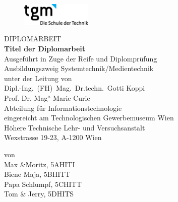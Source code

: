 

\def\tpdefault{{\sf \center \vspace*{-4cm}


\begin{figure}[h]
\begin{flushright}	
		\includegraphics[width=0.3\textwidth]{graphics/title/tgmlogo2.png}
	\label{fig:tgmlogo}
\end{flushright}
\end{figure}


\vspace{2cm}


{\Large %
DIPLOMARBEIT\\ \vspace{0.7cm}}
 {\LARGE \sloppy
{\bf \sf  \textbf{Titel der Diplomarbeit}
\\}}
%
%
\vspace*{2cm}
{\normalsize Ausgef\"uhrt in Zuge der Reife und Diplompr\"ufung\\
Ausbildungszweig Systemtechnik/Medientechnik\\ %
  \vspace{1.5cm}
  \normalsize unter der Leitung von\\
  \large Dipl.-Ing.~(FH)\ Mag.\ Dr.techn.\ Gotti Koppi\\
  \large Prof. Dr. Mag$^a$ Marie Curie\\ 
  \normalsize Abteilung für
  Informationstechnologie\\
  \vspace{1.5cm}
  eingereicht am  Technologischen Gewerbemuseum Wien\\
  H\"ohere Technische Lehr- und Versuchsanstalt\\
  Wexstrasse 19-23, A-1200 Wien\\
  }}}


\begin{titlepage}
	\tpdefault
	{\sf \center \vspace{1.0cm}
	\normalsize von\\
	\large 
	Max \&Moritz, 5AHITI\\
	Biene Maja, 5BHITT\\
	Papa Schlumpf, 5CHITT\\
	Tom \& Jerry, 5DHITS\\
	\vspace {2 cm}
	\bf {} \\
	
	}



	\end{titlepage}

